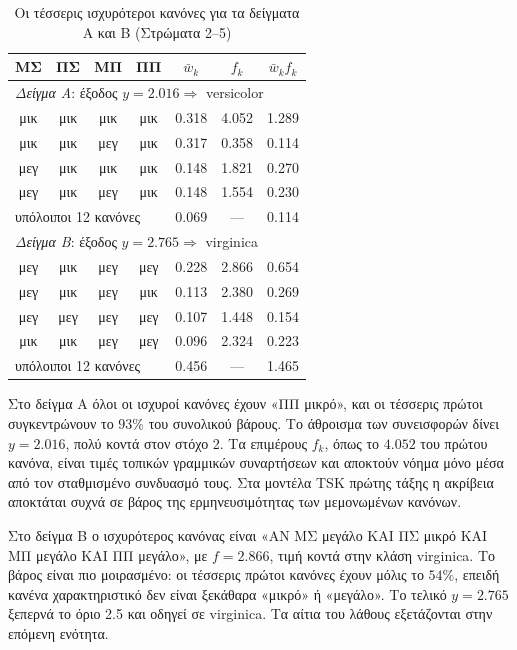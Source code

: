 \documentclass[conference]{IEEEtran}
\begin{document}
\begin{table}[!t]
\centering
\caption{Οι τέσσερις ισχυρότεροι κανόνες για τα δείγματα Α και Β (Στρώματα 2--5)}
\label{tab:rules}
\setlength{\tabcolsep}{3.5pt}
\begin{tabular}{ccccccc}
\toprule
ΜΣ & ΠΣ & ΜΠ & ΠΠ & $\bar w_k$ & $f_k$ & $\bar w_k f_k$ \\
\midrule
\multicolumn{7}{l}{\textit{Δείγμα Α}: έξοδος $y=2.016\Rightarrow$ versicolor} \\
μικ & μικ & μικ & μικ & 0.318 & 4.052 & 1.289 \\
μικ & μικ & μεγ & μικ & 0.317 & 0.358 & 0.114 \\
μεγ & μικ & μικ & μικ & 0.148 & 1.821 & 0.270 \\
μεγ & μικ & μεγ & μικ & 0.148 & 1.554 & 0.230 \\
\multicolumn{4}{l}{υπόλοιποι 12 κανόνες} & 0.069 & --- & 0.114 \\
\midrule
\multicolumn{7}{l}{\textit{Δείγμα Β}: έξοδος $y=2.765\Rightarrow$ virginica} \\
μεγ & μικ & μεγ & μεγ & 0.228 & 2.866 & 0.654 \\
μεγ & μικ & μεγ & μικ & 0.113 & 2.380 & 0.269 \\
μεγ & μεγ & μεγ & μεγ & 0.107 & 1.448 & 0.154 \\
μικ & μικ & μεγ & μεγ & 0.096 & 2.324 & 0.223 \\
\multicolumn{4}{l}{υπόλοιποι 12 κανόνες} & 0.456 & --- & 1.465 \\
\bottomrule
\end{tabular}
\end{table}

Στο δείγμα Α όλοι οι ισχυροί κανόνες έχουν «ΠΠ μικρό», και οι τέσσερις πρώτοι
συγκεντρώνουν το $93\%$ του συνολικού βάρους. Το άθροισμα των συνεισφορών δίνει
$y=2.016$, πολύ κοντά στον στόχο 2. Τα επιμέρους $f_k$, όπως το $4.052$ του
πρώτου κανόνα, είναι τιμές τοπικών γραμμικών συναρτήσεων και αποκτούν νόημα μόνο
μέσα από τον σταθμισμένο συνδυασμό τους. Στα μοντέλα TSK πρώτης τάξης η ακρίβεια
αποκτάται συχνά σε βάρος της ερμηνευσιμότητας των μεμονωμένων κανόνων.

Στο δείγμα Β ο ισχυρότερος κανόνας είναι
«ΑΝ ΜΣ μεγάλο ΚΑΙ ΠΣ μικρό ΚΑΙ ΜΠ μεγάλο ΚΑΙ ΠΠ μεγάλο», με $f=2.866$, τιμή
κοντά στην κλάση virginica. Το βάρος είναι πιο μοιρασμένο: οι τέσσερις πρώτοι
κανόνες έχουν μόλις το $54\%$, επειδή κανένα χαρακτηριστικό δεν είναι ξεκάθαρα
«μικρό» ή «μεγάλο». Το τελικό $y=2.765$ ξεπερνά το όριο 2.5 και οδηγεί σε
virginica. Τα αίτια του λάθους εξετάζονται στην επόμενη ενότητα.
\end{document}
